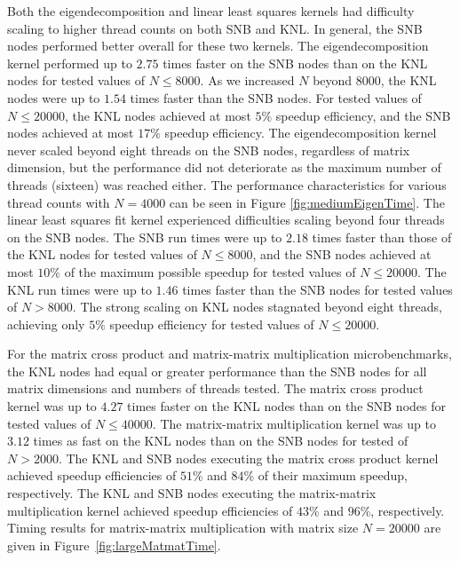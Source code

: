 Both the eigendecomposition and linear least squares kernels had difficulty scaling
to higher thread counts on both SNB and KNL. In general, the SNB nodes performed better
overall for these two kernels. The eigendecomposition kernel performed up to $2.75$ times
faster on the SNB nodes than on the KNL nodes for tested values of $N \leq 8000$.
As we increased $N$ beyond $8000$, the KNL nodes were up to $1.54$
times faster than the SNB nodes. For tested values of $N \leq 20000$, the KNL
nodes achieved at most $5\%$ speedup efficiency, and the SNB nodes achieved
at most $17\%$ speedup efficiency. The eigendecomposition kernel never scaled
beyond eight threads on the SNB nodes, regardless of matrix dimension, but the performance
did not deteriorate as the maximum number of threads (sixteen) was reached either. The
performance characteristics for various thread counts with $N=4000$ can be seen
in Figure \ref{fig:mediumEigenTime}. The linear least squares fit kernel experienced
difficulties scaling beyond four threads on the SNB nodes. The SNB run times were up to
$2.18$ times faster than those of the KNL nodes for tested values of $N \leq 8000$, and
the SNB nodes achieved at most $10\%$ of the maximum possible speedup for tested values of
$N \leq 20000$. The KNL run times were up to $1.46$ times faster than the SNB nodes for
tested values of $N > 8000$. The strong scaling on KNL nodes stagnated beyond
eight threads, achieving only $5\%$ speedup efficiency for tested values of
$N \leq 20000$.

For the matrix cross product and matrix-matrix multiplication microbenchmarks, the KNL
nodes had equal or greater performance than the SNB nodes for all matrix dimensions and
numbers of threads tested. The matrix cross product kernel was up to $4.27$ times faster
on the KNL nodes than on the SNB nodes for tested values of $N \leq 40000$.
The matrix-matrix multiplication kernel was up to $3.12$ times as fast on the KNL nodes
than on the SNB nodes for tested of $N > 2000$. The KNL and SNB
nodes executing the matrix cross product kernel achieved speedup efficiencies of
$51\%$ and $84\%$ of their maximum speedup, respectively. The KNL and SNB nodes executing the matrix-matrix
multiplication kernel achieved speedup efficiencies of $43\%$ and $96\%$, respectively.
Timing results for matrix-matrix multiplication with matrix size $N=20000$
are given in Figure~\ref{fig:largeMatmatTime}.

